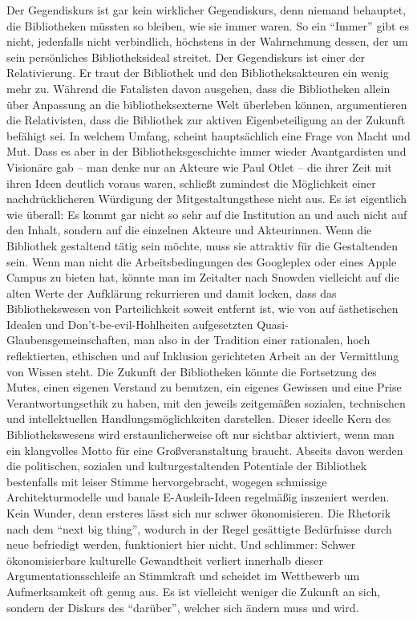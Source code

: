 \documentclass[a4paper,
fontsize=11pt,
oneside,
numbers=noperiodatend,
parskip=half-,
bibliography=totoc,
final
]{scrartcl}
\begin{document}
Der Gegendiskurs ist gar kein wirklicher Gegendiskurs, denn niemand
behauptet, die Bibliotheken müssten so bleiben, wie sie immer waren. So
ein \enquote{Immer} gibt es nicht, jedenfalls nicht verbindlich,
höchstens in der Wahrnehmung dessen, der um sein persönliches
Bibliotheksideal streitet. Der Gegendiskurs ist einer der Relativierung.
Er traut der Bibliothek und den Bibliotheksakteuren ein wenig mehr zu.
Während die Fatalisten davon ausgehen, dass die Bibliotheken allein über
Anpassung an die bibliotheksexterne Welt überleben können, argumentieren
die Relativisten, dass die Bibliothek zur aktiven Eigenbeteiligung an
der Zukunft befähigt sei. In welchem Umfang, scheint hauptsächlich eine
Frage von Macht und Mut. Dass es aber in der Bibliotheksgeschichte immer
wieder Avantgardisten und Visionäre gab -- man denke nur an Akteure wie
Paul Otlet -- die ihrer Zeit mit ihren Ideen deutlich voraus waren,
schließt zumindest die Möglichkeit einer nachdrücklicheren Würdigung der
Mitgestaltungsthese nicht aus. Es ist eigentlich wie überall: Es kommt
gar nicht so sehr auf die Institution an und auch nicht auf den Inhalt,
sondern auf die einzelnen Akteure und Akteurinnen. Wenn die Bibliothek
gestaltend tätig sein möchte, muss sie attraktiv für die Gestaltenden
sein. Wenn man nicht die Arbeitsbedingungen des Googleplex oder eines
Apple Campus zu bieten hat, könnte man im Zeitalter nach Snowden
vielleicht auf die alten Werte der Aufklärung rekurrieren und damit
locken, dass das Bibliothekswesen von Parteilichkeit soweit entfernt
ist, wie von auf ästhetischen Idealen und Don't-be-evil-Hohlheiten
aufgesetzten Quasi-Glaubensgemeinschaften, man also in der Tradition
einer rationalen, hoch reflektierten, ethischen und auf Inklusion
gerichteten Arbeit an der Vermittlung von Wissen steht. Die Zukunft der
Bibliotheken könnte die Fortsetzung des Mutes, einen eigenen Verstand zu
benutzen, ein eigenes Gewissen und eine Prise Verantwortungsethik zu
haben, mit den jeweils zeitgemäßen sozialen, technischen und
intellektuellen Handlungsmöglichkeiten darstellen. Dieser ideelle Kern
des Bibliothekswesens wird erstaunlicherweise oft nur sichtbar
aktiviert, wenn man ein klangvolles Motto für eine Großveranstaltung
braucht. Abseits davon werden die politischen, sozialen und
kulturgestaltenden Potentiale der Bibliothek bestenfalls mit leiser
Stimme hervorgebracht, wogegen schmissige Architekturmodelle und banale
E-Ausleih-Ideen regelmäßig inszeniert werden. Kein Wunder, denn ersteres
lässt sich nur schwer ökonomisieren. Die Rhetorik nach dem \enquote{next
big thing}, wodurch in der Regel gesättigte Bedürfnisse durch neue
befriedigt werden, funktioniert hier nicht. Und schlimmer: Schwer
ökonomisierbare kulturelle Gewandtheit verliert innerhalb dieser
Argumentationsschleife an Stimmkraft und scheidet im Wettbewerb um
Aufmerksamkeit oft genug aus. Es ist vielleicht weniger die Zukunft an
sich, sondern der Diskurs des \enquote{darüber}, welcher sich ändern
muss und wird.
\end{document}
